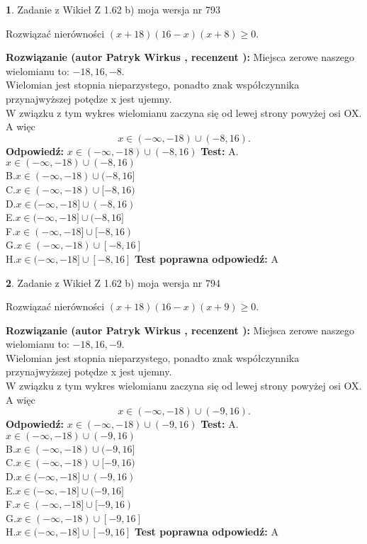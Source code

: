 \documentclass[12pt, a4paper]{article}
\theoremstyle{definition} %
\newtheorem{zad}{}
\newcommand{\zadStart}[1]{\begin{zad}#1\newline}
\newcommand{\zadStop}{\end{zad}}
\newcommand{\rozwStart}[2]{\noindent \textbf{Rozwiązanie (autor #1 , recenzent #2): }\newline}
\newcommand{\rozwStop}{\newline}
\newcommand{\odpStart}{\noindent \textbf{Odpowiedź:}\newline}
\newcommand{\odpStop}{\newline}
\newcommand{\testStart}{\noindent \textbf{Test:}\newline}
\newcommand{\testStop}{\newline}
\newcommand{\kluczStart}{\noindent \textbf{Test poprawna odpowiedź:}\newline}
\newcommand{\kluczStop}{\newline}
\begin{document}
\zadStart{Zadanie z Wikieł Z 1.62 b) moja wersja nr 793}

Rozwiązać nierówności $(x+18)(16-x)(x+8)\ge0$.
\zadStop
\rozwStart{Patryk Wirkus}{}
Miejsca zerowe naszego wielomianu to: $-18, 16, -8$.\\
Wielomian jest stopnia nieparzystego, ponadto znak współczynnika przy\linebreak najwyższej potędze x jest ujemny.\\ W związku z tym wykres wielomianu zaczyna się od lewej strony powyżej osi OX. A więc $$x \in (-\infty,-18) \cup (-8,16).$$
\rozwStop
\odpStart
$x \in (-\infty,-18) \cup (-8,16)$
\odpStop
\testStart
A.$x \in (-\infty,-18) \cup (-8,16)$\\
B.$x \in (-\infty,-18) \cup (-8,16]$\\
C.$x \in (-\infty,-18) \cup [-8,16)$\\
D.$x \in (-\infty,-18] \cup (-8,16)$\\
E.$x \in (-\infty,-18] \cup (-8,16]$\\
F.$x \in (-\infty,-18] \cup [-8,16)$\\
G.$x \in (-\infty,-18) \cup [-8,16]$\\
H.$x \in (-\infty,-18] \cup [-8,16]$
\testStop
\kluczStart
A
\kluczStop



\zadStart{Zadanie z Wikieł Z 1.62 b) moja wersja nr 794}

Rozwiązać nierówności $(x+18)(16-x)(x+9)\ge0$.
\zadStop
\rozwStart{Patryk Wirkus}{}
Miejsca zerowe naszego wielomianu to: $-18, 16, -9$.\\
Wielomian jest stopnia nieparzystego, ponadto znak współczynnika przy\linebreak najwyższej potędze x jest ujemny.\\ W związku z tym wykres wielomianu zaczyna się od lewej strony powyżej osi OX. A więc $$x \in (-\infty,-18) \cup (-9,16).$$
\rozwStop
\odpStart
$x \in (-\infty,-18) \cup (-9,16)$
\odpStop
\testStart
A.$x \in (-\infty,-18) \cup (-9,16)$\\
B.$x \in (-\infty,-18) \cup (-9,16]$\\
C.$x \in (-\infty,-18) \cup [-9,16)$\\
D.$x \in (-\infty,-18] \cup (-9,16)$\\
E.$x \in (-\infty,-18] \cup (-9,16]$\\
F.$x \in (-\infty,-18] \cup [-9,16)$\\
G.$x \in (-\infty,-18) \cup [-9,16]$\\
H.$x \in (-\infty,-18] \cup [-9,16]$
\testStop
\kluczStart
A
\kluczStop
\end{document}
